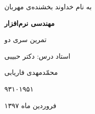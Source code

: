 \begin{center}
\large
به نام خداوند بخشنده‌ی مهربان

\Huge
\vspace*{4cm}
\textbf{مهندسی نرم‌افزار}

\vspace*{1cm}
\large
تمرین سری دو
\vspace*{3cm}

\Large
استاد درس: دکتر حبیبی
\vspace*{2cm}

\vspace*{1cm}

 محمّدمهدی فاریابی
 
۹۳۱۰۱۹۵۱
\vspace*{3cm}
\large

فروردین ماه ۱۳۹۷
\vspace*{5cm}

\end{center}
\newpage

